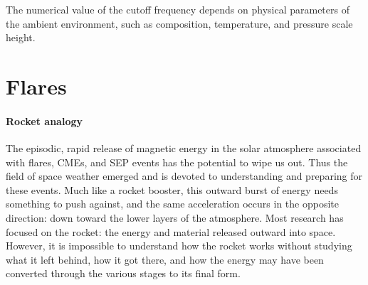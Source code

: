 
The numerical value of the cutoff
frequency depends on physical parameters of the ambient environment,
such as composition, temperature, and pressure scale height.




\newpage

\section{Flares}


\paragraph{Rocket analogy}
The episodic, rapid release of magnetic energy in the solar atmosphere
associated with flares, CMEs, and SEP events has the potential to wipe us out.
Thus the field of space weather emerged and is devoted to understanding and
preparing for these events. Much like a rocket booster, this outward burst of
energy needs something to push against, and the same acceleration occurs in the
opposite direction: down toward the lower layers of the atmosphere. Most
research has focused on the rocket: the energy and material released outward
into space. However, it is impossible to understand how the rocket works
without studying what it left behind, how it got there, and how the energy may
have been converted through the various stages to its final form.

